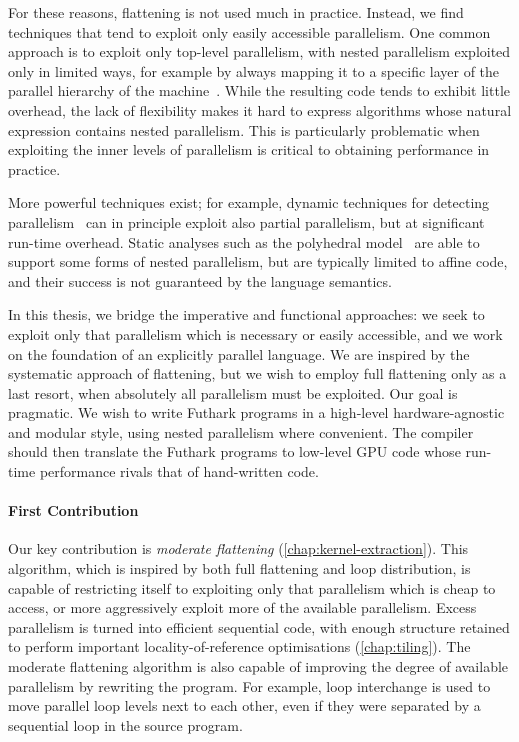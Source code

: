 For these reasons, flattening is not used much in practice.  Instead,
we find techniques that tend to exploit only easily accessible
parallelism.  One common approach is to exploit only top-level
parallelism, with nested parallelism exploited only in limited ways,
for example by always mapping it to a specific layer of the parallel
hierarchy of the
machine~\cite{grelck2006sac,DeliteNestedPar,mcdonell2013optimising,Steuwer:2015:GPP:2858949.2784754}.
While the resulting code tends to exhibit little overhead, the lack of
flexibility makes it hard to express algorithms whose natural
expression contains nested parallelism.  This is particularly
problematic when exploiting the inner levels of parallelism is
critical to obtaining performance in practice.

More powerful techniques exist; for example, dynamic techniques for
detecting parallelism~\cite{SpLSC} can in principle exploit also
partial parallelism, but at significant run-time overhead.  Static
analyses such as the polyhedral
model~\cite{PolyhedralOpt,RedPencil,PolyPluto2,chatarasi2015polyhedral}
are able to support some forms of nested parallelism, but are
typically limited to affine code, and their success is not guaranteed
by the language semantics.

In this thesis, we bridge the imperative and functional approaches: we
seek to exploit only that parallelism which is necessary or easily
accessible, and we work on the foundation of an explicitly parallel
language.    We are inspired by the systematic approach of flattening,
but we wish to employ full flattening only as a last resort, when
absolutely all parallelism must be exploited.  Our goal is pragmatic.
We wish to write Futhark programs in a high-level hardware-agnostic
and modular style, using nested parallelism where convenient.  The
compiler should then translate the Futhark programs to low-level GPU
code whose run-time performance rivals that of hand-written code.

\paragraph{First Contribution}

Our key contribution is \textit{moderate flattening}
(\cref{chap:kernel-extraction}).  This algorithm, which is inspired by
both full flattening and loop distribution, is capable of restricting
itself to exploiting only that parallelism which is cheap to access,
or more aggressively exploit more of the available parallelism.
Excess parallelism is turned into efficient sequential code, with
enough structure retained to perform important locality-of-reference
optimisations (\cref{chap:tiling}).  The moderate flattening algorithm
is also capable of improving the degree of available parallelism by
rewriting the program.  For example, loop interchange is used to move
parallel loop levels next to each other, even if they were separated
by a sequential loop in the source program.


